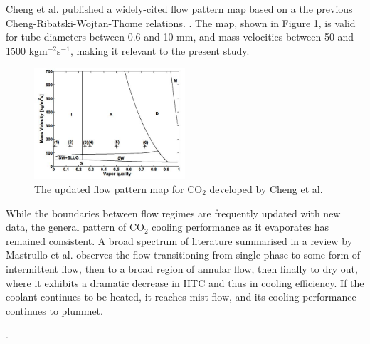 \documentclass{report}
\begin{document}
Cheng et al. published a widely-cited flow pattern map based on a the previous Cheng-Ribatski-Wojtan-Thome relations. \cite{Cheng 2008}. The map, shown in Figure \ref{fig:chengMap}, is valid for tube diameters between 0.6 and 10 mm, and mass velocities between 50 and 1500 kgm$^{-2}$s$^{-1}$, making it relevant to the present study.\\
\begin{figure}
\includegraphics[width=0.5\textwidth]{chengMap}
\caption{The updated flow pattern map for CO$_2$ developed by Cheng et al. \cite{Cheng 2008}}
\label{fig:chengMap}
\end{figure}
While the boundaries between flow regimes are frequently updated with new data, the general pattern of CO$_2$ cooling performance as it evaporates has remained consistent. A broad spectrum of literature summarised in a review by Mastrullo et al. \cite{Mastrullo 2010} observes the flow transitioning from single-phase to some form of intermittent flow, then to a broad region of annular flow, then finally to dry out, where it exhibits a dramatic decrease in HTC and thus in cooling efficiency. If the coolant continues to be heated, it reaches mist flow, and its cooling performance continues to plummet. 

\cite{Mastrullo 2012}. \cite{Mastrullo 2012b}
\end{document}

